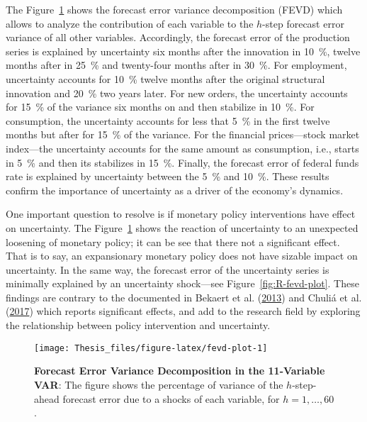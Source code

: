 \documentclass[12pt,twoside]{reedthesis}
\begin{document}
The Figure~\ref{fig:fevd-plot} shows the forecast error variance decomposition (FEVD) which allows to analyze the contribution of each variable to the \(h\)-step forecast error variance of all other variables. Accordingly, the forecast error of the production series is explained by uncertainty six months after the innovation in 10~\%, twelve months after in 25~\% and twenty-four months after in 30~\%. For employment, uncertainty accounts for 10~\% twelve months after the original structural innovation and 20~\% two years later. For new orders, the uncertainty accounts for 15~\% of the variance six months on and then stabilize in 10~\%. For consumption, the uncertainty accounts for less that 5~\% in the first twelve months but after for 15~\% of the variance. For the financial prices---stock market index---the uncertainty accounts for the same amount as consumption, i.e., starts in 5~\% and then its stabilizes in 15~\%. Finally, the forecast error of federal funds rate is explained by uncertainty between the 5~\% and 10~\%. These results confirm the importance of uncertainty as a driver of the economy's dynamics.

One important question to resolve is if monetary policy interventions have effect on uncertainty. The Figure~\ref{fig:fevd-plot} shows the reaction of uncertainty to an unexpected loosening of monetary policy; it can be see that there not a significant effect. That is to say, an expansionary monetary policy does not have sizable impact on uncertainty. In the same way, the forecast error of the uncertainty series is minimally explained by an uncertainty shock---see Figure~\ref{fig:R-fevd-plot}. These findings are contrary to the documented in Bekaert et al. (\protect\hyperlink{ref-bekaetal:2013}{2013}) and Chuliá et al. (\protect\hyperlink{ref-chuletal:2017}{2017}) which reports significant effects, and add to the research field by exploring the relationship between policy intervention and uncertainty.


\begin{figure}

{\centering \texttt{[image: Thesis\_files/figure-latex/fevd-plot-1]} 

}

\caption[Forecast Error Variance Decomposition in the 11-Variable VAR]{\textbf{Forecast Error Variance Decomposition in the 11-Variable VAR}: The figure shows the percentage of variance of the \(h\)-step-ahead forecast error due to a shocks of each variable, for \(h = 1, \ldots, 60\).}\label{fig:fevd-plot}
\end{figure}
\end{document}
